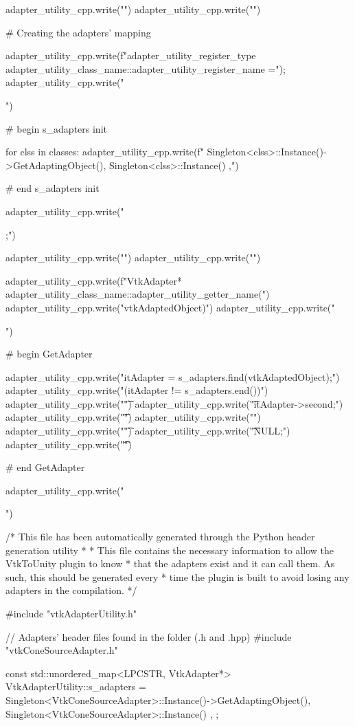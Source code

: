 \begin{appendices}
\begin{python}[label=lst:generateheader,caption={generate-header.py script},aboveskip=20pt]
adapter_utility_cpp.write("\n")
adapter_utility_cpp.write("\n")

# Creating the adapters' mapping

adapter_utility_cpp.write(f"{adapter_utility_register_type} {adapter_utility_class_name}::{adapter_utility_register_name} =");
adapter_utility_cpp.write("{\n")

# begin s_adapters init

for clss in classes:    
    adapter_utility_cpp.write(f"\t{{ Singleton<{clss}>::Instance()->GetAdaptingObject(), Singleton<{clss}>::Instance() }},\n")

# end s_adapters init

adapter_utility_cpp.write("};\n")

adapter_utility_cpp.write("\n")
adapter_utility_cpp.write("\n")

adapter_utility_cpp.write(f"VtkAdapter* {adapter_utility_class_name}::{adapter_utility_getter_name}(\n")
adapter_utility_cpp.write("\tLPCSTR vtkAdaptedObject)\n")
adapter_utility_cpp.write("{\n")

# begin GetAdapter

adapter_utility_cpp.write("\tauto itAdapter = s_adapters.find(vtkAdaptedObject);\n")
adapter_utility_cpp.write("\tif (itAdapter != s_adapters.end())\n")
adapter_utility_cpp.write("\t{\n")
adapter_utility_cpp.write("\t\treturn itAdapter->second;\n")
adapter_utility_cpp.write("\t}\n")
adapter_utility_cpp.write("\telse\n")
adapter_utility_cpp.write("\t{\n")
adapter_utility_cpp.write("\t\treturn NULL;\n")
adapter_utility_cpp.write("\t}\n")

# end GetAdapter

adapter_utility_cpp.write("}\n")
\end{python}
    
\begin{cpp}[label=lst:vtkadapterutilityex,caption={Example VtkAdapterUtility.cpp},aboveskip=20pt]
/* This file has been automatically generated through the Python header generation utility
 * 
 * This file contains the necessary information to allow the VtkToUnity plugin to know
 * that the adapters exist and it can call them. As such, this should be generated every
 * time the plugin is built to avoid losing any adapters in the compilation.
 */


#include "vtkAdapterUtility.h"

// Adapters' header files found in the folder (.h and .hpp)
#include "vtkConeSourceAdapter.h"


const std::unordered_map<LPCSTR, VtkAdapter*> VtkAdapterUtility::s_adapters ={
	{ Singleton<VtkConeSourceAdapter>::Instance()->GetAdaptingObject(), Singleton<VtkConeSourceAdapter>::Instance() },
};



\end{cpp}
\end{appendices}

